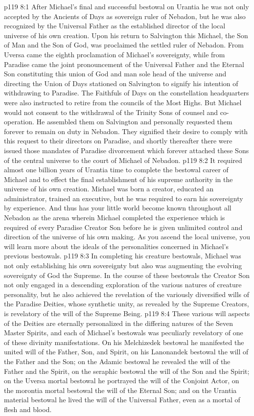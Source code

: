 \vs p119 8:1 After Michael’s final and successful bestowal on Urantia he was not only accepted by the Ancients of Days as sovereign ruler of Nebadon, but he was also recognized by the Universal Father as the established director of the local universe of his own creation. Upon his return to Salvington this Michael, the Son of Man and the Son of God, was proclaimed the settled ruler of Nebadon. From Uversa came the eighth proclamation of Michael’s sovereignty, while from Paradise came the joint pronouncement of the Universal Father and the Eternal Son constituting this union of God and man sole head of the universe and directing the Union of Days stationed on Salvington to signify his intention of withdrawing to Paradise. The Faithfuls of Days on the constellation headquarters were also instructed to retire from the councils of the Most Highs. But Michael would not consent to the withdrawal of the Trinity Sons of counsel and co\hyp{}operation. He assembled them on Salvington and personally requested them forever to remain on duty in Nebadon. They signified their desire to comply with this request to their directors on Paradise, and shortly thereafter there were issued those mandates of Paradise divorcement which forever attached these Sons of the central universe to the court of Michael of Nebadon.
\vs p119 8:2 \pc It required almost one billion years of Urantia time to complete the bestowal career of Michael and to effect the final establishment of his supreme authority in the universe of his own creation. Michael was born a creator, educated an administrator, trained an executive, but he was required to earn his sovereignty by experience. And thus has your little world become known throughout all Nebadon as the arena wherein Michael completed the experience which is required of every Paradise Creator Son before he is given unlimited control and direction of the universe of his own making. As you ascend the local universe, you will learn more about the ideals of the personalities concerned in Michael’s previous bestowals.
\vs p119 8:3 \pc In completing his creature bestowals, Michael was not only establishing his own sovereignty but also was augmenting the evolving sovereignty of God the Supreme. In the course of these bestowals the Creator Son not only engaged in a descending exploration of the various natures of creature personality, but he also achieved the revelation of the variously diversified wills of the Paradise Deities, whose synthetic unity, as revealed by the Supreme Creators, is revelatory of the will of the Supreme Being.
\vs p119 8:4 These various will aspects of the Deities are eternally personalized in the differing natures of the Seven Master Spirits, and each of Michael’s bestowals was peculiarly revelatory of one of these divinity manifestations. On his Melchizedek bestowal he manifested the united will of the Father, Son, and Spirit, on his Lanonandek bestowal the will of the Father and the Son; on the Adamic bestowal he revealed the will of the Father and the Spirit, on the seraphic bestowal the will of the Son and the Spirit; on the Uversa mortal bestowal he portrayed the will of the Conjoint Actor, on the morontia mortal bestowal the will of the Eternal Son; and on the Urantia material bestowal he lived the will of the Universal Father, even as a mortal of flesh and blood.
